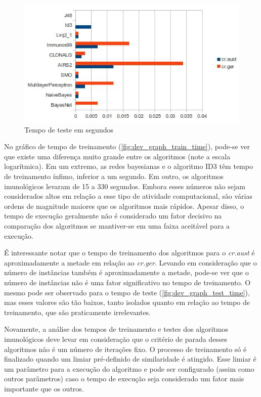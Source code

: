 \begin{figure}[h]
    \centering
    \caption{Tempo de teste em segundos}
    \label{fig:dev_graph_test_time}
    \label{fig:dev_graph_last}
    \includegraphics[width=1\textwidth]{img/graph_test_time.jpg}
\end{figure}

No gráfico de tempo de treinamento (\ref{fig:dev_graph_train_time}), pode-se ver que existe uma diferença muito grande entre os algoritmos (note a escala logarítmica). Em um extremo, as redes bayesianas e o algoritmo ID3 têm tempo de treinamento ínfimo, inferior a um segundo. Em outro, os algoritmos imunológicos levaram de 15 a 330 segundos. Embora esses números não sejam considerados altos em relação a esse tipo de atividade computacional, são várias ordens de magnitude maiores que os algoritmos mais rápidos. Apesar disso, o tempo de execução geralmente não é considerado um fator decisivo na comparação dos algoritmos se mantiver-se em uma faixa aceitável para a execução.

É interessante notar que o tempo de treinamento dos algoritmos para o \emph{cr.aust} é aproximadamente a metade em relação ao \emph{cr.ger}. Levando em consideração que o número de instâncias também é aproximadamente a metade, pode-se ver que o número de instâncias não é uma fator significativo no tempo de treinamento. O mesmo pode ser observado para o tempo de teste (\ref{fig:dev_graph_test_time}), mas esses valores são tão baixos, tanto isolados quanto em relação ao tempo de treinamento, que são praticamente irrelevantes.

Novamente, a análise dos tempos de treinamento e testes dos algoritmos imunológicos deve levar em consideração que o critério de parada desses algoritmos não é um número de iterações fixo. O processo de treinamento só é finalizado quando um limiar pré-definido de similaridade é atingido. Esse limiar é um parâmetro para a execução do algoritmo e pode ser configurado (assim como outros parâmetros) caso o tempo de execução seja considerado um fator mais importante que os outros.
